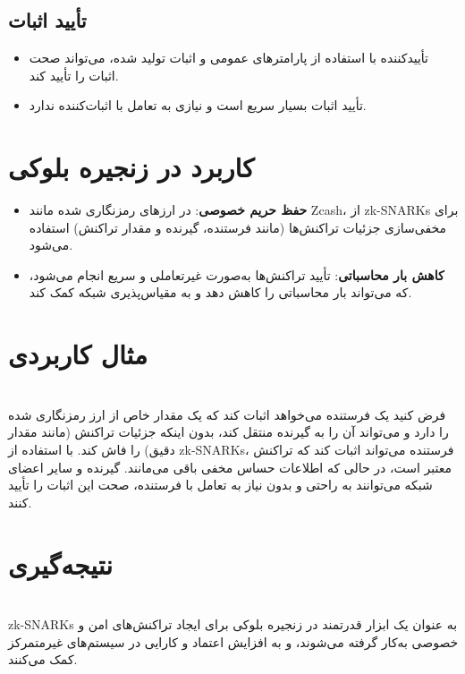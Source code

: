 \documentclass{article}
\begin{document}
\subsection{تأیید اثبات }
\begin{itemize}
    \item تأییدکننده با استفاده از پارامترهای عمومی و اثبات تولید شده، می‌تواند صحت اثبات را تأیید کند.
    \item تأیید اثبات بسیار سریع است و نیازی به تعامل با اثبات‌کننده ندارد.
\end{itemize}

\section{کاربرد در زنجیره بلوکی}
\begin{itemize}
    \item \textbf{حفظ حریم خصوصی}: در ارزهای رمزنگاری شده مانند Zcash، از zk-SNARKs برای مخفی‌سازی جزئیات تراکنش‌ها (مانند فرستنده، گیرنده و مقدار تراکنش) استفاده می‌شود.
    \item \textbf{کاهش بار محاسباتی}: تأیید تراکنش‌ها به‌صورت غیرتعاملی و سریع انجام می‌شود، که می‌تواند بار محاسباتی را کاهش دهد و به مقیاس‌پذیری شبکه کمک کند.
\end{itemize}

\section{مثال کاربردی}
\leavevmode
\\
فرض کنید یک فرستنده می‌خواهد اثبات کند که یک مقدار خاص از ارز رمزنگاری شده را دارد و می‌تواند آن را به گیرنده منتقل کند، بدون اینکه جزئیات تراکنش (مانند مقدار دقیق) را فاش کند. با استفاده از zk-SNARKs، فرستنده می‌تواند اثبات کند که تراکنش معتبر است، در حالی که اطلاعات حساس مخفی باقی می‌مانند. گیرنده و سایر اعضای شبکه می‌توانند به راحتی و بدون نیاز به تعامل با فرستنده، صحت این اثبات را تأیید کنند.

\section{نتیجه‌گیری}
\leavevmode
\\
zk-SNARKs به عنوان یک ابزار قدرتمند در زنجیره بلوکی برای ایجاد تراکنش‌های امن و خصوصی به‌کار گرفته می‌شوند، و به افزایش اعتماد و کارایی در سیستم‌های غیرمتمرکز کمک می‌کنند.
\end{document}
